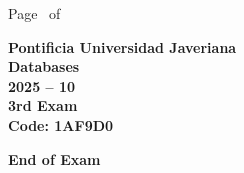 \documentclass[11pt, addpoints]{exam}\usepackage[utf8]{inputenc}
\begin{document}
\begin{coverpages}
\begin{center}
			\vspace{3mm}
			\leavevmode \hspace{5mm} 
		\end{center}
	\end{coverpages}

	\footer{} {Page \thepage\ of \numpages} {}

	\centering
	\textbf{\Large Pontificia Universidad Javeriana}\\
	\textbf{\Large Databases} \\
	\textbf{\large 2025 -- 10} \\
	\textbf{\large 3rd Exam} \\
	\textbf{Code: 1AF9D0}


	\begin{questions}
		
		
		
		
		
		
		
		
		
		
		
		
		
		
		
		
		
		
		
		
	\end{questions}

	\vspace{5mm}
	\noindent \textbf{End of Exam}
\end{document}
